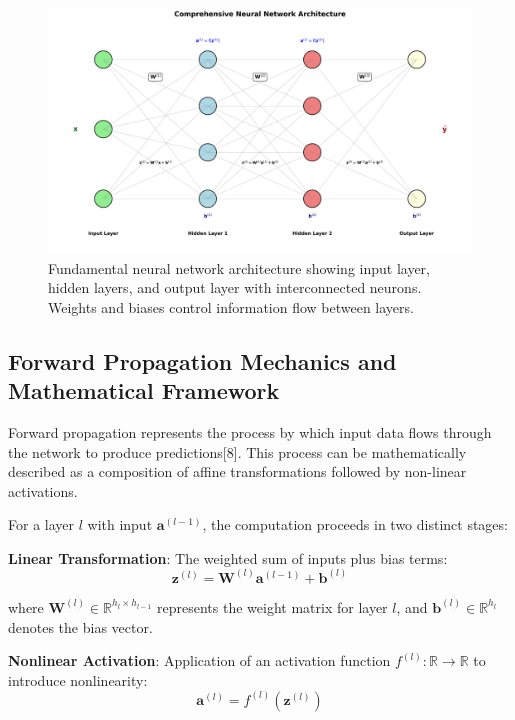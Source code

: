 \documentclass[11pt,a4paper]{report}
\begin{document}
\begin{figure}[H]
\centering
\includegraphics[width=1\textwidth]{neural_network_architecture.png}
\caption{Fundamental neural network architecture showing input layer, hidden layers, and output layer with interconnected neurons. Weights and biases control information flow between layers.}
\label{fig:nn_architecture}
\end{figure}

\subsection{Forward Propagation Mechanics and Mathematical Framework}

Forward propagation represents the process by which input data flows through the network to produce predictions[8]. This process can be mathematically described as a composition of affine transformations followed by non-linear activations.

For a layer $l$ with input $\mathbf{a}^{(l-1)}$, the computation proceeds in two distinct stages:

\textbf{Linear Transformation}: The weighted sum of inputs plus bias terms:
\begin{equation}
\mathbf{z}^{(l)} = \mathbf{W}^{(l)} \mathbf{a}^{(l-1)} + \mathbf{b}^{(l)}
\end{equation}

where $\mathbf{W}^{(l)} \in \mathbb{R}^{h_l \times h_{l-1}}$ represents the weight matrix for layer $l$, and $\mathbf{b}^{(l)} \in \mathbb{R}^{h_l}$ denotes the bias vector.

\textbf{Nonlinear Activation}: Application of an activation function $f^{(l)}: \mathbb{R} \rightarrow \mathbb{R}$ to introduce nonlinearity:
\begin{equation}
\mathbf{a}^{(l)} = f^{(l)}(\mathbf{z}^{(l)})
\end{equation}
\end{document}
